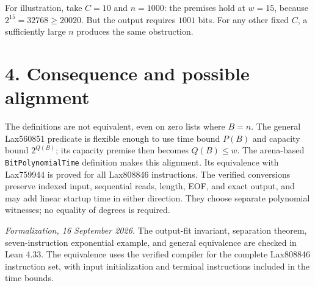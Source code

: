 \documentclass[11pt,a4paper]{article}
\newcommand{\code}[1]{\texttt{#1}}
\begin{document}
For illustration, take $C=10$ and $n=1000$: the premises hold at $w=15$,
because $2^{15}=32768\ge20020$. But the output requires $1001$ bits.
For any other fixed $C$, a sufficiently large $n$ produces the same obstruction.

\section*{4. Consequence and possible alignment}

The definitions are not equivalent, even on zero lists where $B=n$. The
general Lax560851 predicate is flexible enough to use time bound $P(B)$ and
capacity bound $2^{Q(B)}$; its capacity premise then becomes $Q(B)\le w$.
The arena-based \code{BitPolynomialTime} definition makes this alignment.
Its equivalence with Lax759944 is proved for all Lax808846 instructions.
The verified conversions preserve indexed input, sequential reads, length,
EOF, and exact output, and may add linear startup time in either direction.
They choose separate polynomial witnesses; no equality of degrees is required.

\small
\textit{Formalization, 16 September 2026.} The output-fit invariant,
separation theorem, seven-instruction exponential example, and general
equivalence are checked in Lean 4.33. The equivalence uses the verified
compiler for the complete Lax808846 instruction set, with input initialization
and terminal instructions included in the time bounds.
\end{document}
